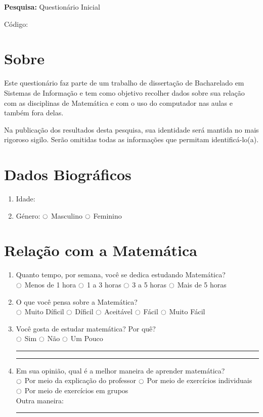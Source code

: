 \label{ap:questionario_inicial}

\noindent \textbf{Pesquisa:} Questionário Inicial

\noindent
Código: 

\section{Sobre}

Este questionário faz parte de um trabalho de dissertação de Bacharelado em Sistemas de Informação e tem como objetivo recolher dados sobre sua relação com as disciplinas de Matemática e com o uso do computador nas aulas e também fora delas.

Na publicação dos resultados desta pesquisa, sua identidade será mantida no mais rigoroso sigilo. Serão omitidas todas as informações que permitam identificá-lo(a). 

\section{Dados Biográficos}

\begin{enumerate}
	\item Idade: 
    \item Género: $\ocircle$ Masculino $\ocircle$ Feminino
\end{enumerate}

\section{Relação com a Matemática}

\begin{enumerate}
\item Quanto tempo, por semana, você se dedica estudando Matemática? \\
$\ocircle$ Menos de 1 hora $\ocircle$ 1 a 3 horas $\ocircle$ 3 a 5 horas $\ocircle$ Mais de 5 horas

\item O que você pensa sobre a Matemática? \\
$\ocircle$ Muito Díficil $\ocircle$ Díficil $\ocircle$ Aceitável $\ocircle$ Fácil $\ocircle$ Muito Fácil

\item Você gosta de estudar matemática? Por quê? \\
$\ocircle$ Sim $\ocircle$ Não $\ocircle$ Um Pouco \\
\noindent\rule{\textwidth}{0.4pt}
\noindent\rule{\textwidth}{0.4pt}

\item Em sua opinião, qual é a melhor maneira de aprender matemática? \\
$\ocircle$ Por meio da explicação do professor $\ocircle$ Por meio de exercícios individuais \\
$\ocircle$ Por meio de exercícios em grupos \\
Outra maneira: \\
\noindent\rule{\textwidth}{0.4pt}

\end{enumerate}

